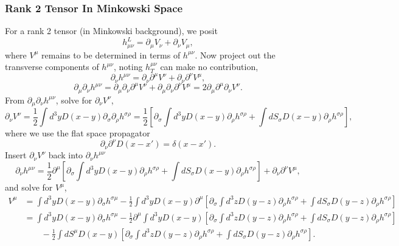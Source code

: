 \documentclass[10pt,letterpaper]{article}
\begin{document}
\subsubsection{Rank 2 Tensor In Minkowski Space}
For a rank 2 tensor (in Minkowski background), we posit
\begin{equation}
h^L_{\mu\nu} = \partial_\mu V_\nu + \partial_\nu V_\mu,
\end{equation}
where $V^{\mu}$ remains to be determined in terms of $h^{\mu\nu}$.
Now project out the transverse components of $h^{\mu\nu}$, noting $h^{\mu\nu}_T$ can make no contribution,
\begin{equation}
\partial_\nu h^{\mu\nu} = \partial_\nu \partial^\mu V^\nu + \partial_\nu \partial^\nu V^\mu,
\end{equation}
\begin{equation}
\partial_\mu \partial_\nu h^{\mu\nu} = \partial_\mu\partial_\nu \partial^\mu V^\nu + \partial_\mu\partial_\nu \partial^\nu V^\mu
= 2 \partial_\mu \partial^\mu \partial_\nu V^\nu.
\end{equation}
From $\partial_\mu\partial_\nu h^{\mu\nu}$, solve for $\partial_\nu V^\nu$,
\begin{equation}
\partial_\nu V^\nu = \frac12 \int d^3y D(x-y) \partial_\sigma\partial_\rho h^{\sigma\rho}
= \frac12\left[ \partial_\sigma \int d^3y D(x-y)\partial_\rho h^{\sigma\rho}
+ \int dS_\sigma D(x-y) \partial_\rho h^{\sigma\rho}\right],
\end{equation}
where we use the flat space propagator
\begin{equation}
\partial_\nu \partial^\nu D(x-x') = \delta(x-x').
\end{equation}
Insert $\partial_\nu V^\nu$ back into $\partial_\nu h^{\mu\nu}$
\begin{equation}
\partial_\nu h^{\mu\nu} =  \frac12 \partial^\mu\left[ \partial_\sigma \int d^3y D(x-y)\partial_\rho h^{\sigma\rho}
+ \int dS_\sigma D(x-y) \partial_\rho h^{\sigma\rho}\right] + \partial_\nu \partial^\nu V^\mu,
\end{equation}
and solve for $V^\mu$,
\begin{align}
V^\mu &= \int d^3y D(x-y)\partial_\sigma h^{\sigma\mu} -  \frac12\int d^3y D(x-y) \partial^\mu \left[ \partial_\sigma \int d^3z D(y-z)\partial_\rho h^{\sigma\rho}
+ \int dS_\sigma D(y-z) \partial_\rho h^{\sigma\rho}\right]\\
&=  \int d^3y D(x-y)\partial_\sigma h^{\sigma\mu} -  \frac12
\partial^\mu \int d^3y D(x-y)\left[ \partial_\sigma \int d^3z D(y-z)\partial_\rho h^{\sigma\rho}
+ \int dS_\sigma D(y-z) \partial_\rho h^{\sigma\rho}\right]\\
&\qquad
-\frac12 \int dS^\mu D(x-y)\left[ \partial_\sigma \int d^3z D(y-z)\partial_\rho h^{\sigma\rho}
+ \int dS_\sigma D(y-z) \partial_\rho h^{\sigma\rho}\right].
\end{align}
\end{document}
